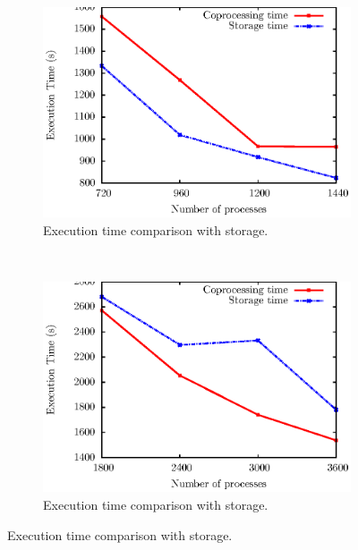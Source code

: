 \begin{figure}
        \begin{subfigure}[b]{0.50\textwidth}
                \includegraphics[scale=0.50]{pictures/test2.ps}
                \caption{Execution time comparison with storage.}
                \label{fig:ensight}
        \end{subfigure}
        ~
        \begin{subfigure}[b]{0.50\textwidth}
                \includegraphics[scale=0.50]{pictures/test22.ps}
                \caption{Execution time comparison with storage.}
                \label{fig:204ensight}
        \end{subfigure}


\end{figure}

